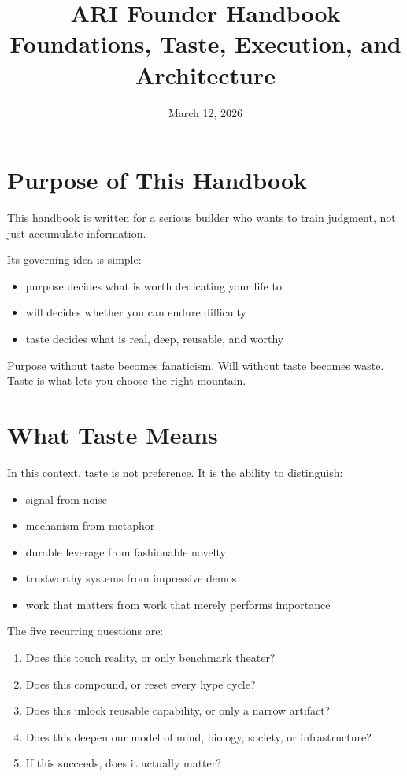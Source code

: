 \documentclass[11pt]{article}
\title{ARI Founder Handbook\\\large Foundations, Taste, Execution, and Architecture}
\author{}
\date{March 12, 2026}
\begin{document}
\maketitle
\tableofcontents
\newpage

\section{Purpose of This Handbook}

This handbook is written for a serious builder who wants to train judgment, not just accumulate information.

Its governing idea is simple:

\begin{itemize}
  \item purpose decides what is worth dedicating your life to
  \item will decides whether you can endure difficulty
  \item taste decides what is real, deep, reusable, and worthy
\end{itemize}

Purpose without taste becomes fanaticism. Will without taste becomes waste. Taste is what lets you choose the right mountain.

\section{What Taste Means}

In this context, taste is not preference. It is the ability to distinguish:

\begin{itemize}
  \item signal from noise
  \item mechanism from metaphor
  \item durable leverage from fashionable novelty
  \item trustworthy systems from impressive demos
  \item work that matters from work that merely performs importance
\end{itemize}

The five recurring questions are:

\begin{enumerate}
  \item Does this touch reality, or only benchmark theater?
  \item Does this compound, or reset every hype cycle?
  \item Does this unlock reusable capability, or only a narrow artifact?
  \item Does this deepen our model of mind, biology, society, or infrastructure?
  \item If this succeeds, does it actually matter?
\end{enumerate}
\end{document}
